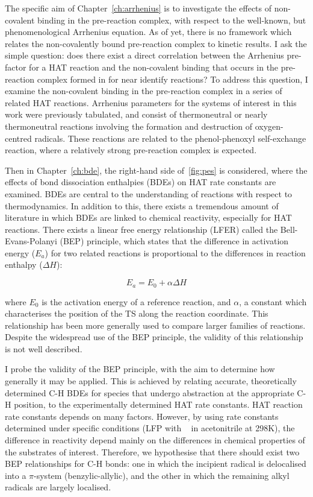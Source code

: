 The specific aim of Chapter~\ref{ch:arrhenius} is to investigate the effects of non-covalent binding in the pre-reaction complex, with respect to the well-known, but phenomenological Arrhenius equation. As of yet, there is no framework which relates the non-covalently bound pre-reaction complex to kinetic results. I ask the simple question: does there exist a direct correlation between the Arrhenius pre-factor for a HAT reaction and the non-covalent binding that occurs in the pre-reaction complex formed in for near identify reactions? To address this question, I examine the non-covalent binding in the pre-reaction complex in a series of related HAT reactions. Arrhenius parameters for the systems of interest in this work were previously tabulated,\cite{DiLabio2005} and consist of thermoneutral or nearly thermoneutral reactions involving the formation and destruction of oxygen-centred radicals. These reactions are related to the phenol-phenoxyl self-exchange reaction, where a relatively strong pre-reaction complex is expected.

Then in Chapter~\ref{ch:bde}, the right-hand side of~\ref{fig:pes} is considered, where the effects of bond dissociation enthalpies (BDEs) on HAT rate constants are examined. BDEs are central to the understanding of reactions with respect to thermodynamics. In addition to this, there exists a tremendous amount of literature in which BDEs are linked to chemical reactivity, especially for HAT reactions.\cite{Kochi1973, Tedder1982, Wijtmans2003, Pratt2004, Mayer2004} There exists a linear free energy relationship (LFER) called the Bell-Evans-Polanyi (BEP) principle,\cite{Bell1936,Evans1938} which states that the difference in activation energy ($E_a$) for two related reactions is proportional to the differences in reaction enthalpy ($\Delta H$):

\begin{equation}
  E_a = E_0 + \alpha \Delta H
  \label{eq:bep}
\end{equation}

\noindent where $E_0$ is the activation energy of a reference reaction, and $\alpha$, a constant which characterises the position of the TS along the reaction coordinate. This relationship has been more generally used to compare larger families of reactions. Despite the widespread use of the BEP principle, the validity of this relationship is not well described.

I probe the validity of the BEP principle, with the aim to determine how generally it may be applied. This is achieved by relating accurate, theoretically determined C-H BDEs for species that undergo abstraction at the appropriate C-H position, to the experimentally determined HAT rate constants. HAT reaction rate constants depends on many factors. However, by using rate constants determined under specific conditions (LFP with \cumo~ in acetonitrile at 298K), the difference in reactivity depend mainly on the differences in chemical properties of the substrates of interest. Therefore, we hypothesise that there should exist two BEP relationships for C-H bonds: one in which the incipient radical is delocalised into a $\pi$-system (benzylic-allylic), and the other in which the remaining alkyl radicals are largely localised.

